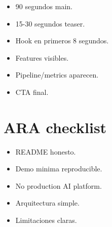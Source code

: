 \begin{itemize}
\item 90 segundos main.
\item 15-30 segundos teaser.
\item Hook en primeros 8 segundos.
\item Features visibles.
\item Pipeline/metrics aparecen.
\item CTA final.
\end{itemize}


\section{ARA checklist}


\begin{itemize}
\item README honesto.
\item Demo minima reproducible.
\item No production AI platform.
\item Arquitectura simple.
\item Limitaciones claras.
\end{itemize}
